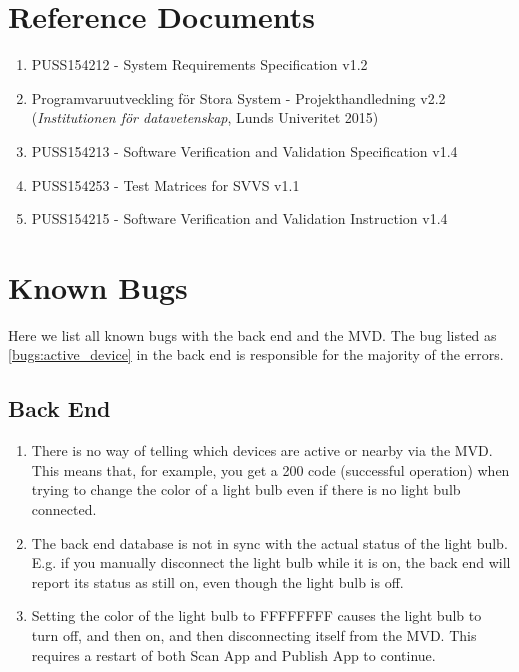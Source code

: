 \documentclass[a4paper]{article}
\begin{document}
\setcounter{tocdepth}{2}
\tableofcontents
\newpage
{}


\section*{Reference Documents}
\begin{enumerate}
\item PUSS154212 - System Requirements Specification v1.2 \label{refdocs:srs} 
\item Programvaruutveckling för Stora System - Projekthandledning v2.2 \newline (\textit{Institutionen för datavetenskap}, Lunds Univeritet 2015) \label{refdocs:projekthandledning}
\item PUSS154213 - Software Verification and Validation Specification v1.4 \label{refdocs:SVVS}
\item PUSS154253 - Test Matrices for SVVS v1.1 \label{refdocs:matrices}
\item PUSS154215 - Software Verification and Validation Instruction v1.4 \label{refdocs:SVVI}
\end{enumerate}

\section{Known Bugs}
Here we list all known bugs with the back end and the MVD. The bug listed as \ref{bugs:active_device} in the back end is responsible for the majority of the errors.

\subsection{Back End}
\begin{enumerate}
	\item  There is no way of telling which devices are active or nearby via the MVD. This means that, for example, you get a 200 code (successful operation) when trying to change the color of a light bulb even if there is no light bulb connected. \label{bugs:active_device}

	\item The back end database is not in sync with the actual status of the light bulb. E.g. if you manually disconnect the light bulb while it is on, the back end will report its status as still on, even though the light bulb is off.

	\item Setting the color of the light bulb to FFFFFFFF causes the light bulb to turn off, and then on, and then disconnecting itself from the MVD. This requires a restart of both Scan App and Publish App to continue.

\end{enumerate}
\end{document}
